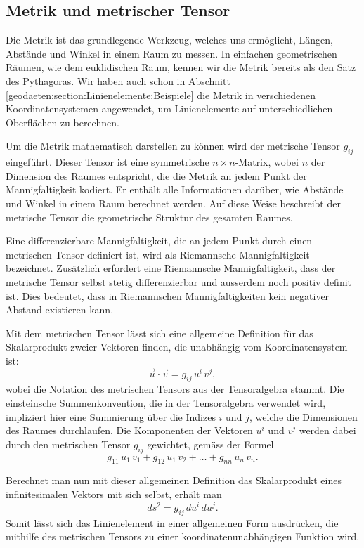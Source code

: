 \subsection{Metrik und metrischer Tensor}

Die Metrik ist das grundlegende Werkzeug, welches uns ermöglicht, Längen, Abstände und Winkel in einem Raum zu messen.
In einfachen geometrischen Räumen, wie dem euklidischen Raum, kennen wir die Metrik bereits als den Satz des Pythagoras.
Wir haben auch schon in Abschnitt \ref{geodaeten:section:Linienelemente:Beispiele} die Metrik in verschiedenen Koordinatensystemen angewendet, um Linienelemente auf unterschiedlichen Oberflächen zu berechnen.

Um die Metrik mathematisch darstellen zu können wird der metrische Tensor $g_{ij}$ eingeführt.
Dieser Tensor ist eine symmetrische $n \times n$-Matrix, wobei $n$ der Dimension des Raumes entspricht, die die Metrik an jedem Punkt der Mannigfaltigkeit kodiert.
Er enthält alle Informationen darüber, wie Abstände und Winkel in einem Raum berechnet werden.
Auf diese Weise beschreibt der metrische Tensor die geometrische Struktur des gesamten Raumes.

Eine differenzierbare Mannigfaltigkeit, die an jedem Punkt durch einen metrischen Tensor definiert ist, wird als Riemannsche Mannigfaltigkeit bezeichnet. Zusätzlich erfordert eine Riemannsche Mannigfaltigkeit, dass der metrische Tensor selbst stetig differenzierbar und ausserdem noch positiv definit ist. 
Dies bedeutet, dass in Riemannschen Mannigfaltigkeiten kein negativer Abstand existieren kann.

Mit dem metrischen Tensor lässt sich eine allgemeine Definition für das Skalarprodukt zweier Vektoren finden, die unabhängig vom Koordinatensystem ist:
\begin{equation}
	\vec{u} \cdot \vec{v} = g_{ij} \, u^i \, v^j ,
\end{equation}
wobei die Notation des metrischen Tensors aus der Tensoralgebra stammt.
Die einsteinsche Summenkonvention, die in der Tensoralgebra verwendet wird, impliziert hier eine Summierung über die Indizes $i$ und $j$, welche die Dimensionen des Raumes durchlaufen.
Die Komponenten der Vektoren $u^i$ und $v^j$ werden dabei durch den metrischen Tensor $g_{ij}$ gewichtet, gemäss der Formel
\begin{equation}
	g_{11} \, u_1 \, v_1 + g_{12} \, u_1 \, v_2 + \dots + g_{nn} \, u_n \, v_n.
\end{equation}

Berechnet man nun mit dieser allgemeinen Definition das Skalarprodukt eines infinitesimalen Vektors mit sich selbst, erhält man
\begin{equation}
	ds^2 = g_{ij} \, du^i \, du^j.
	\label{geodaeten:equation:MetrischerTensor:AllgemeinesLinienelement}
\end{equation}
Somit lässt sich das Linienelement in einer allgemeinen Form ausdrücken, die mithilfe des metrischen Tensors zu einer koordinatenunabhängigen Funktion wird.

